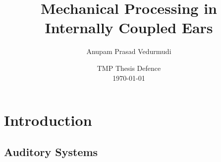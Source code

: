 \documentclass{beamer}
\title{\LARGE Mechanical Processing in Internally Coupled Ears}
\author{\Large Anupam Prasad Vedurmudi}
\date{TMP Thesis Defence\\ \today}
\begin{document}
\begin{frame}[t]
 \titlepage
 

\end{frame}



\section{Introduction}
\subsection{Auditory Systems}
\end{document}
